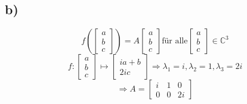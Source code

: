 \documentclass[a4paper, 11pt]{article}
\begin{document}
\subsection{b)}
\label{sec:org8aa4275}
$$f\left(\begin{bmatrix} a \\ b \\ c\end{bmatrix}\right) = A\begin{bmatrix} a \\ b \\ c\end{bmatrix} \text{für alle} \begin{bmatrix} a \\ b \\ c\end{bmatrix} \in \mathbb{C}^3$$
$$f: \begin{bmatrix} a \\ b \\ c\end{bmatrix} \mapsto \begin{bmatrix} ia + b\\ 2ic\end{bmatrix} \Rightarrow \lambda_1 = i, \lambda_2 = 1, \lambda_3 = 2i$$
$$\Rightarrow A = \begin{bmatrix} i & 1 & 0 \\ 0 & 0 & 2i\end{bmatrix}$$
\end{document}

